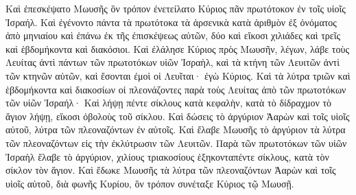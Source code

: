 {Καὶ ἐπεσκέψατο Μωυσῆς ὃν τρόπον ἐνετείλατο Κύριος πᾶν πρωτότοκον ἐν τοῖς υἱοῖς Ἰσραήλ.
Καὶ ἐγένοντο πάντα τὰ πρωτότοκα τὰ ἀρσενικὰ κατὰ ἀριθμὸν ἐξ ὀνόματος ἀπὸ μηνιαίου καὶ ἐπάνω ἐκ τῆς ἐπισκέψεως αὐτῶν, δύο καὶ εἴκοσι χιλιάδες καὶ τρεῖς καὶ ἑβδομήκοντα καὶ διακόσιοι.
Καὶ ἐλάλησε Κύριος πρὸς Μωυσῆν, λέγων,
λάβε τοὺς Λευίτας ἀντὶ πάντων τῶν πρωτοτόκων υἱῶν Ἰσραὴλ, καὶ τὰ κτήνη τῶν Λευιτῶν ἀντὶ τῶν κτηνῶν αὐτῶν, καὶ ἔσονται ἐμοὶ οἱ Λευῖται· ἐγὼ Κύριος.
Καὶ τὰ λύτρα τριῶν καὶ ἑβδομήκοντα καὶ διακοσίων οἱ πλεονάζοντες παρὰ τοὺς Λευίτας ἀπὸ τῶν πρωτοτόκων τῶν υἱῶν Ἰσραήλ·
Καὶ λήψῃ πέντε σίκλους κατὰ κεφαλὴν, κατὰ τὸ δίδραχμον τὸ ἅγιον λήψῃ, εἴκοσι ὀβολοὺς τοῦ σίκλου.
Καὶ δώσεις τὸ ἀργύριον Ἀαρὼν καὶ τοῖς υἱοῖς αὐτοῦ, λύτρα τῶν πλεοναζόντων ἐν αὐτοῖς.
Καὶ ἔλαβε Μωυσῆς τὸ ἀργύριον τὰ λύτρα τῶν πλεοναζόντων εἰς τὴν ἐκλύτρωσιν τῶν Λευιτῶν.
Παρὰ τῶν πρωτοτόκων τῶν υἱῶν Ἰσραὴλ ἔλαβε τὸ ἀργύριον, χιλίους τριακοσίους ἑξηκονταπέντε σίκλους, κατὰ τὸν σίκλον τὸν ἅγιον.
Καὶ ἔδωκε Μωυσῆς τὰ λύτρα τῶν πλεοναζόντων Ἀαρὼν καὶ τοῖς υἱοῖς αὐτοῦ, διὰ φωνῆς Κυρίου, ὃν τρόπον συνέταξε Κύριος τῷ Μωυσῇ.

}
